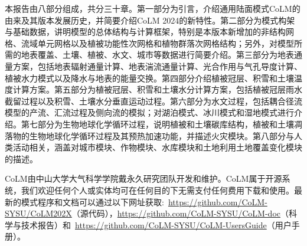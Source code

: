本报告由八部分组成，共分三十章。第一部分为引言，介绍通用陆面模式CoLM的由来及其版本发展历史，并简要介绍CoLM 2024的新特性。第二部分为模式构架与基础数据，讲明模型的总体结构与计算框架，特别是本版本新增加的非结构网格、流域单元网格以及植被功能性次网格和植物群落次网格结构；另外，对模型所需的地表覆盖、土壤、植被、水文、城市等数据进行简要介绍。第三部分为地表通量方案，包括地表辐射通量计算、地表湍流通量计算、光合作用与气孔导度计算、植被水力模式以及降水与地表的能量交换。第四部分介绍植被冠层、积雪和土壤温度计算方案。第五部分为植被冠层、积雪和土壤水分计算方案，包括植被冠层雨水截留过程以及积雪、土壤水分垂直运动过程。第六部分为水文过程，包括耦合径流模型的产流、汇流过程及侧向流的模拟；对湖泊模式、冰川模式和湿地模式进行介绍。第七部分为生物地球化学循环过程，说明植被和土壤碳库结构，植被和土壤凋落物的生物地球化学循环过程及其预热加速功能，并描述火灾模块。第八部分与人类活动相关，涵盖对城市模块、作物模块、水库模块和土地利用土地覆盖变化模块的描述。

CoLM由中山大学大气科学学院戴永久研究团队开发和维护。CoLM属于开源系统，我们欢迎任何个人或实体均可在任何目的下无需支付任何费用下载和使用。最新的模式程序和文档可以通过以下网址获取:~\url{https://github.com/CoLM-SYSU/CoLM202X}（源代码），\url{https://github.com/CoLM-SYSU/CoLM-doc}（科学与技术报告）和~\url{https://github.com/CoLM-SYSU/CoLM-UsersGuide}（用户手册）。
